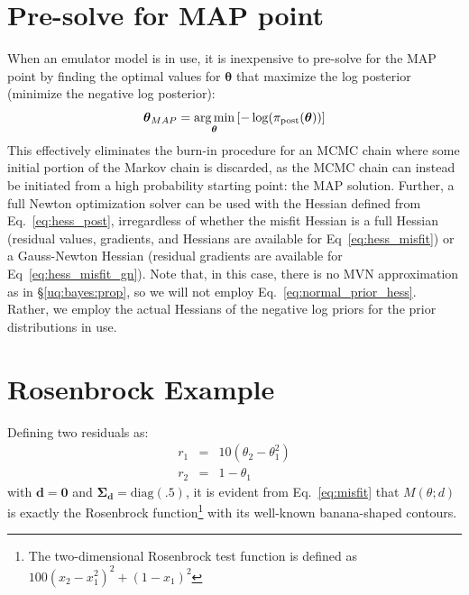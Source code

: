 \section{Pre-solve for MAP point} \label{uq:bayes:map}

When an emulator model is in use, it is inexpensive to pre-solve for
the MAP point by finding the optimal values for $\boldsymbol{\theta}$
that maximize the log posterior (minimize the negative log posterior):
\begin{equation}
\boldsymbol{\theta}_{MAP} = \operatorname*{arg\,min}_{\boldsymbol{\theta}} 
\left[ -\log(\pi_{\rm post}(\boldsymbol{\theta})) \right]
\label{eq:map_soln}
\end{equation}
This effectively eliminates the burn-in procedure for an MCMC chain
where some initial portion of the Markov chain is discarded, as the
MCMC chain can instead be initiated from a high probability starting
point: the MAP solution.  Further, a full Newton optimization solver
can be used with the Hessian defined from Eq.~\ref{eq:hess_post},
irregardless of whether the misfit Hessian is a full Hessian (residual
values, gradients, and Hessians are available for
Eq~\ref{eq:hess_misfit}) or a Gauss-Newton Hessian (residual gradients
are available for Eq~\ref{eq:hess_misfit_gn}).  Note that, in this
case, there is no MVN approximation as in \S\ref{uq:bayes:prop}, so we
will not employ Eq.~\ref{eq:normal_prior_hess}.  Rather, we employ the
actual Hessians of the negative log priors for the prior distributions
in use.


\section{Rosenbrock Example} \label{uq:bayes:ex}

Defining two residuals as:
\begin{eqnarray}
r_1 &=& 10 (\theta_2 - \theta_1^2) \label{eq:rosen_r1} \\
r_2 &=& 1 - \theta_1 \label{eq:rosen_r2}
\end{eqnarray}
with $\boldsymbol{d} = \boldsymbol{0}$ and $\boldsymbol{\Sigma_d} =
\text{diag}(\boldsymbol{.5})$, it is evident from Eq.~\ref{eq:misfit}
that $M(\theta;d)$ is exactly the Rosenbrock function\footnote{The
  two-dimensional Rosenbrock test function is defined as $100 (x_2 -
  x_1^2)^2 + (1 - x_1)^2$} with its well-known banana-shaped contours.

